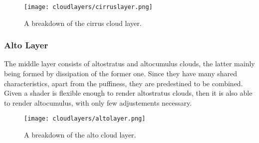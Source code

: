 \begin{figure}[H]
    \texttt{[image: cloudlayers/cirruslayer.png]}
    \caption{A breakdown of the cirrus cloud layer.}
    \label{img:cloudlayer:cirrus}
\end{figure}

\subsubsection{Alto Layer}
The middle layer consists of altostratus and altocumulus clouds, the latter mainly being formed by dissipation of the former one.
Since they have many shared characteristics, apart from the puffiness, they are predestined to be combined.
\\
Given a \gls{shader} is flexible enough to render altostratus clouds, then it is also able to render altocumulus, with only few adjustements necessary.

\begin{figure}[H]
    \texttt{[image: cloudlayers/altolayer.png]}
    \caption{A breakdown of the alto cloud layer.}
    \label{img:cloudlayer:alto}
\end{figure}